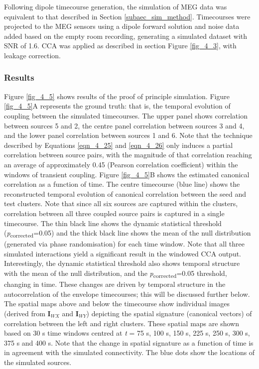 Following dipole timecourse generation, the simulation of MEG data was equivalent to that described in Section \ref{subaec_sim_method}. Timecourses were projected to the MEG sensors using a dipole forward solution and noise data added based on the empty room recording, generating a simulated dataset with SNR of 1.6. CCA was applied as described in section Figure \ref{fig_4_3}, with leakage correction.

\subsubsection{Results}
Figure \ref{fig_4_5} shows results of the proof of principle simulation. Figure \ref{fig_4_5}A represents the ground truth: that is, the temporal evolution of coupling between the simulated timecourses. The upper panel shows correlation between sources 5 and 2, the centre panel correlation between sources 3 and 4, and the lower panel correlation between sources 1 and 6. Note that the technique described by Equations \ref{eqn_4_25} and \ref{eqn_4_26} only induces a partial correlation between source pairs, with the magnitude of that correlation reaching an average of approximately 0.45 (Pearson correlation coefficient) within the windows of transient coupling. Figure \ref{fig_4_5}B shows the estimated canonical correlation as a function of time. The centre timecourse (blue line) shows the reconstructed temporal evolution of canonical correlation between the seed and test clusters. Note that since all six sources are captured within the clusters, correlation between all three coupled source pairs is captured in a single timecourse. The thin black line shows the dynamic statistical threshold (\textit{p}\textsubscript{corrected}=0.05) and the thick black line shows the mean of the null distribution (generated via phase randomisation) for each time window. Note that all three simulated interactions yield a significant result in the windowed CCA output. Interestingly, the dynamic statistical threshold also shows temporal structure with the mean of the null distribution, and the \textit{p}\textsubscript{corrected}=0.05 threshold, changing in time. These changes are driven by temporal structure in the autocorrelation of the envelope timecourses; this will be discussed further below. The spatial maps above and below the timecourse show individual images (derived from $\mathbf{I}_{WX}$ and $\mathbf{I}_{WY}$) depicting the spatial signature (canonical vectors) of correlation between the left and right clusters. These spatial maps are shown based on 30 s time windows centred at \textit{t} = 75 s, 100 s, 150 s, 225 s, 250 s, 300 s, 375 s and 400 s. Note that the change in spatial signature as a function of time is in agreement with the simulated connectivity. The blue dots show the locations of the simulated sources.


